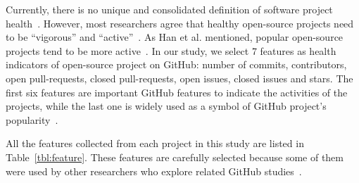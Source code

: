 \documentclass[sigconf,anonymous,review]{acmart}
\newcommand{\tbl}[1]{Table~\ref{tbl:#1}}
\begin{document}
Currently, there is no unique and consolidated definition of software project health~\cite{jansen2014measuring,liao2019healthy,link2018assessing}.
However,  most researchers agree that healthy open-source projects need to be ``vigorous'' and ``active''~\cite{wahyudin2007monitoring,jansen2014measuring,manikas2013reviewing,link2018assessing,wynn2007assessing,crowston2006assessing}. As Han et al. mentioned, popular open-source projects tend to be more active~\cite{han2019characterization}. In our study, we select 7 features as health indicators of open-source project on GitHub: number of commits, contributors, open pull-requests, closed pull-requests, open issues, closed issues and stars. The first six features are important GitHub features to indicate the activities of the projects, while the last one is widely used as a symbol of GitHub project's popularity~\cite{borges2016understanding,han2019characterization,aggarwal2014co}.

All the features collected from each project in this study 
are listed in  \tbl{feature}. These features are carefully selected because some of them were used by other researchers who explore related
GitHub studies~\cite{coelho2020github, yu2016reviewer, han2019characterization}.  







 
 



\end{document}
